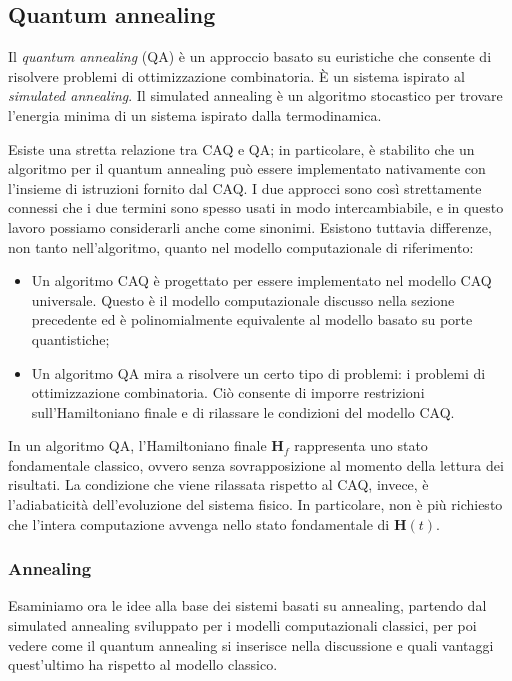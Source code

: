 \subsection{Quantum annealing}
Il \emph{quantum annealing} (QA) è un approccio basato su euristiche che consente di risolvere problemi di ottimizzazione combinatoria. È un sistema ispirato al \emph{simulated annealing}. Il simulated annealing è un algoritmo stocastico per trovare l'energia minima di un sistema ispirato dalla termodinamica.

Esiste una stretta relazione tra CAQ e QA; in particolare, è stabilito che un algoritmo per il quantum annealing può essere implementato nativamente con l'insieme di istruzioni fornito dal CAQ. I due approcci sono così strettamente connessi che i due termini sono spesso usati in modo intercambiabile, e in questo lavoro possiamo considerarli anche come sinonimi. Esistono tuttavia differenze, non tanto nell'algoritmo, quanto nel modello computazionale di riferimento:
\begin{itemize}
	\item Un algoritmo CAQ è progettato per essere implementato nel modello CAQ universale. Questo è il modello computazionale discusso nella sezione precedente ed è polinomialmente equivalente al modello basato su porte quantistiche;
	\item Un algoritmo QA mira a risolvere un certo tipo di problemi: i problemi di ottimizzazione combinatoria. Ciò consente di imporre restrizioni sull'Hamiltoniano finale e di rilassare le condizioni del modello CAQ.
\end{itemize}
In un algoritmo QA, l'Hamiltoniano finale $\mathbf{H}_f$ rappresenta uno stato fondamentale classico, ovvero senza sovrapposizione al momento della lettura dei risultati. La condizione che viene rilassata rispetto al CAQ, invece, è l'adiabaticità dell'evoluzione del sistema fisico. In particolare, non è più richiesto che l'intera computazione avvenga nello stato fondamentale di $\mathbf{H}(t)$.

\subsubsection*{Annealing}
Esaminiamo ora le idee alla base dei sistemi basati su annealing, partendo dal simulated annealing sviluppato per i modelli computazionali classici, per poi vedere come il quantum annealing si inserisce nella discussione e quali vantaggi quest'ultimo ha rispetto al modello classico.


